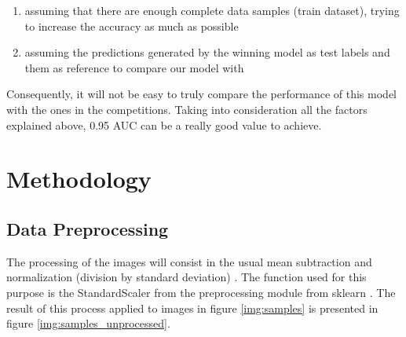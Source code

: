 \documentclass[]{article}
\begin{document}
\begin{enumerate}
	\item assuming that there are enough complete data samples (train dataset), trying to increase the accuracy as much as possible
	\item assuming the predictions generated by the winning model as test labels and them as reference to compare our model with
\end{enumerate}

Consequently, it will not be easy to truly compare the performance 
of this model with the ones in the competitions. Taking into consideration all the factors explained above, 0.95 AUC can be a really good value to achieve.

\pagebreak
\section{Methodology}\label{iii.-methodology}

\subsection{Data Preprocessing}\label{data-preprocessing}

The processing of the images will consist in the usual mean subtraction and normalization (division by standard deviation) \cite{cs231preprocessing}. The function used for this purpose is the StandardScaler from the preprocessing module from sklearn \cite{sklearn_standard_scaler}. The result of this process applied to images in figure \ref{img:samples} is presented in figure \ref{img:samples_unprocessed}. 
\end{document}
